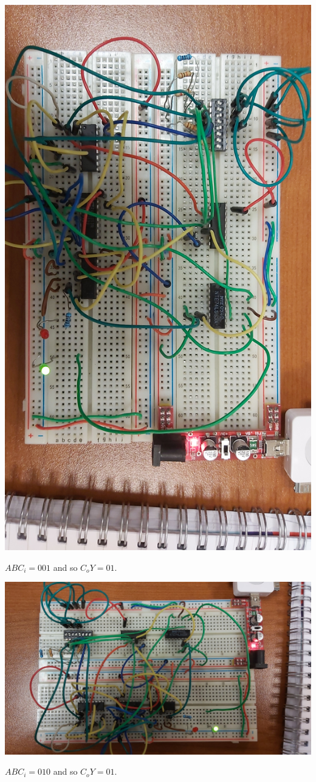 \documentclass{article}
\begin{document}
\includegraphics[width=\textwidth]{./figures/00101.jpg}
\begin{center}
	$ABC_i = 001$ and so $C_o Y= 01$.\\
\end{center}


\includegraphics[width=\textwidth]{./figures/01001.jpg}
\begin{center}
	$ABC_i = 010$ and so $C_o Y= 01$.
\end{center}
\end{document}
